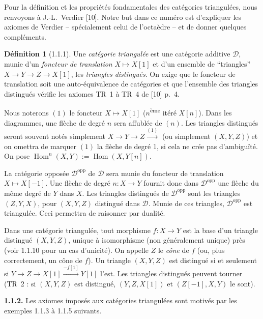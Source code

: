\documentclass[12pt,a4paper]{article}
\theoremstyle{plain}
\theoremstyle{definition}
\newtheorem{definition}[theorem]{Définition}
\theoremstyle{remark}
\DeclareMathOperator{\Hom}{Hom}
\newcommand{\cD}{\mathcal{D}}
\begin{document}
Pour la définition et les propriétés fondamentales des catégories triangulées, nous renvoyons à J.-L.~Verdier [10]. Notre but dans ce numéro est d'expliquer les axiomes de Verdier -- spécialement celui de l'octaèdre -- et de donner quelques compléments.

\begin{definition}[1.1.1]
Une \emph{catégorie triangulée} est une catégorie additive $\cD$, munie d'un \emph{foncteur de translation} $X \longmapsto X[1]$ et d'un ensemble de ``triangles'' $X \to Y \to Z \to X[1]$, les \emph{triangles distingués}. On exige que le foncteur de translation soit une auto-équivalence de catégories et que l'ensemble des triangles distingués vérifie les axiomes TR~1 à TR~4 de [10] p.~4.
\end{definition}

Nous noterons $(1)$ le foncteur $X \mapsto X[1]$ ($n$\textsuperscript{ème} itéré $X[n]$). Dans les diagrammes, une flèche de degré $n$ sera affublée de $(n)$. Les triangles distingués seront souvent notés simplement $X \to Y \to Z \xrightarrow{(1)}$ (ou simplement $(X, Y, Z)$) et on omettra de marquer $(1)$ la flèche de degré 1, si cela ne crée pas d'ambiguïté. On pose $\Hom^{n}(X, Y) := \Hom(X, Y[n])$.

La catégorie opposée $\cD^{\mathrm{opp}}$ de $\cD$ sera munie du foncteur de translation $X \mapsto X[-1]$. Une flèche de degré $n : X \to Y$ fournit donc dans $\cD^{\mathrm{opp}}$ une flèche du même degré de $Y$ dans $X$. Les triangles distingués de $\cD^{\mathrm{opp}}$ sont les triangles $(Z, Y, X)$, pour $(X, Y, Z)$ distingué dans $\cD$. Munie de ces triangles, $\cD^{\mathrm{opp}}$ est triangulée. Ceci permettra de raisonner par dualité.

Dans une catégorie triangulée, tout morphisme $f : X \to Y$ est la base d'un triangle distingué $(X, Y, Z)$, unique à isomorphisme (non généralement unique) près (voir 1.1.10 pour un cas d'unicité). On appelle $Z$ le \emph{cône} de $f$ (ou, plus correctement, un cône de $f$). Un triangle $(X, Y, Z)$ est distingué si et seulement si $Y \to Z \to X[1] \xrightarrow{-f[1]} Y[1]$ l'est. Les triangles distingués peuvent tourner (TR~2 : si $(X, Y, Z)$ est distingué, $(Y, Z, X[1])$ et $(Z[-1], X, Y)$ le sont).

\medskip

\noindent
\textbf{1.1.2.} Les axiomes imposés aux catégories triangulées sont motivés par les exemples 1.1.3 à 1.1.5 suivants.

\medskip
\end{document}
